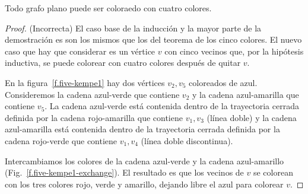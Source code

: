 \begin{theorem}\label{thm.fourcolor}
Todo grafo plano puede ser coloraedo con cuatro colores.
\end{theorem}

\begin{proof} (Incorrecta) El caso base de la inducción y la mayor parte de la demostración es son los mismos que los del teorema de los cinco colores. El nuevo caso que hay que considerar es un vértice $v$ con cinco vecinos que, por la hipótesis inductiva, se puede colorear con cuatro colores después de quitar $v$.

En la figura~\ref{f.five-kempe1} hay dos vértices $v_2,v_5$ coloreados de azul. Consideremos la cadena azul-verde que contiene $v_2$ y la cadena azul-amarilla que contiene $v_5$. La cadena azul-verde está contenida dentro de la trayectoria cerrada definida por la cadena rojo-amarilla que contiene $v_1,v_3$ (línea doble) y la cadena azul-amarilla está contenida dentro de la trayectoria cerrada definida por la cadena rojo-verde que contiene $v_1,v_4$ (línea doble discontinua).

Intercambiamos los colores de la cadena azul-verde y la cadena azul-amarillo (Fig.~\ref{f.five-kempe1-exchange}). El resultado es que los vecinos de $v$ se colorean con los tres colores rojo, verde y amarillo, dejando libre el azul para colorear $v$.
\end{proof}

